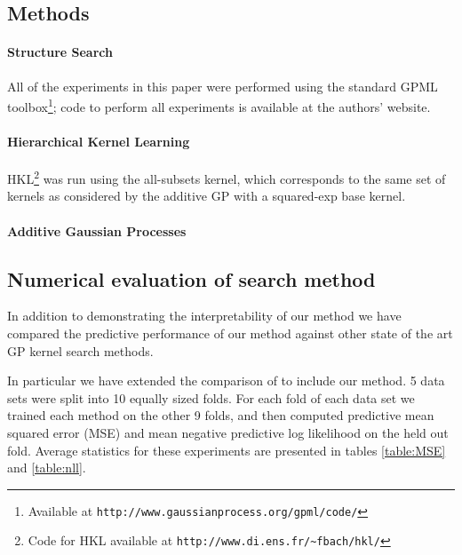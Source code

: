 \documentclass[twoside]{article}
\begin{document}
\subsection{Methods}

\paragraph{Structure Search}
All of the experiments in this paper were performed using the standard GPML toolbox\footnote{Available at \texttt{http://www.gaussianprocess.org/gpml/code/}}; code to perform all experiments is available at the authors' website.

\paragraph{Hierarchical Kernel Learning}	
HKL\footnote{Code for HKL available at \texttt{http://www.di.ens.fr/\textasciitilde fbach/hkl/}} was run using the all-subsets kernel, which corresponds to the same set of kernels as considered by the additive GP with a squared-exp base kernel.

%
%
%
%
%

\paragraph{Additive Gaussian Processes} \cite{duvenaud2011additive11}

\subsection{Numerical evaluation of search method}

In addition to demonstrating the interpretability of our method we have compared the predictive performance of our method against other state of the art GP kernel search methods.

In particular we have extended the comparison of \cite{duvenaud2011additive11} to include our method.
5 data sets were split into 10 equally sized folds.
For each fold of each data set we trained each method on the other 9 folds, and then computed predictive mean squared error (MSE) and mean negative predictive log likelihood on the held out fold.
Average statistics for these experiments are presented in tables \ref{table:MSE} and \ref{table:nll}.
\end{document}
